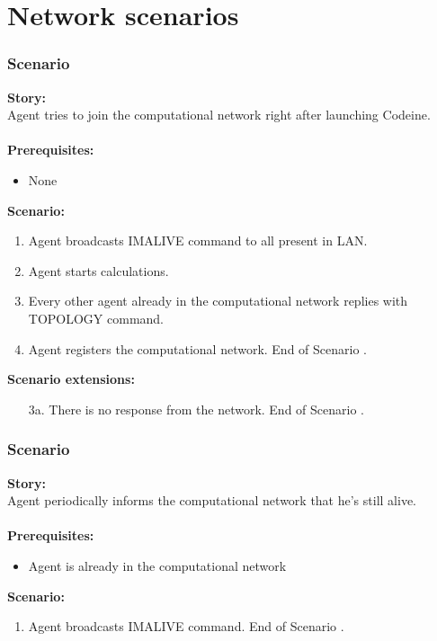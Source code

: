 \documentclass{article}
\begin{document}
\section{Network scenarios}
\setcounter{scenarioCounter}{1}

\subsubsection{Scenario }
\noindent\textbf{Story:} \\
Agent tries to join the computational network right after launching Codeine. \\\\
\textbf{Prerequisites:}
\begin{itemize}
    \item None
\end{itemize}
\textbf{Scenario:}
\begin{enumerate}
    \item Agent broadcasts IMALIVE command to all present in LAN.
    \item Agent starts calculations.
    \item Every other agent already in the computational network replies with TOPOLOGY command.
    \item Agent registers the computational network. End of Scenario .
\end{enumerate}
\textbf{Scenario extensions:}
\begin{itemize}
    \item[3a.] There is no response from the network. End of Scenario .
\end{itemize}

\subsubsection{Scenario }
\noindent\textbf{Story:} \\
Agent periodically informs the computational network that he's still alive. \\\\
\textbf{Prerequisites:}
\begin{itemize}
    \item Agent is already in the computational network
\end{itemize}
\textbf{Scenario:}
\begin{enumerate}
    \item Agent broadcasts IMALIVE command. End of Scenario .
\end{enumerate}
\end{document}
